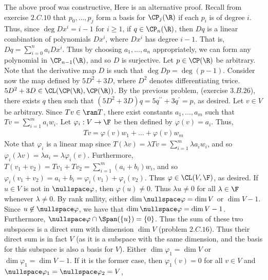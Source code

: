 \documentclass{book}
\begin{document}
\begin{enumerate}[label=\arabic*)]
      The above proof was constructive, Here is an alternative proof. Recall from exercise $2.C.10$ that $p_0, \dots, p_j$ form a basis for $\CP_j(\R)$ if each $p_i$ is of degree $i$. Thus,
      since $\deg D x^{i} = i - 1$ for $i \geq 1$, if $q \in \CP_{n}(\R)$, then $Dq$ is a linear combination of polynomials $Dx^{i}$, where $Dx^{i}$ has degree $i - 1$. That is, $Dq =
      \sum_{i = 0}^{n}a_iDx^{i}$. Thus by choosing $a_1, \dots, a_n$ appropriately, we can form any polynomial in $\CP_{n - 1}(\R)$, and so $D$ is surjective.
    \ii
      Let $p \in \CP(\R)$ be arbitrary. Note that the derivative map $D$ is such that $\deg Dp = \deg (p - 1)$. Consider now the map defined by $5D^2 + 3D$, where $D^2$ denotes
      differentiating twice. $5D^2 + 3D \in \CL(\CP(\R), \CP(\R))$. By the previous problem, (exercise $3.B.26$), there exists $q$ then such that $(5D^2 + 3D)q = 5q^{\prime\prime} +
      3q^{\prime} = p$, as desired.
    \ii
      Let $v \in V$ be arbitrary. Since $Tv \in \ran T$, there exist constants $a_1, \dots, a_m$ such that $Tv = \sum_{i = 1}^{m}a_iw_i$. Let $\varphi_i: V \to \F$ be then defined by
      $\varphi(v) = a_i$. Thus,
      \begin{align*}
        Tv = \varphi(v)w_1 + \dots + \varphi(v)w_m
      \end{align*}
      Note that $\varphi_i$ is a linear map since $T(\lambda v) = \lambda Tv = \sum_{i = 1}^{m}\lambda a_iw_i$, and so $\varphi_i(\lambda v) = \lambda a_i = \lambda\varphi_i(v)$.
      Furthermore, $T(v_1 + v_2) = Tv_1 + Tv_2 = \sum_{i = 1}^{m}(a_i + b_i)w_i$, and so $\varphi_i(v_1 + v_2) = a_i + b_i = \varphi_i(v_1) + \varphi_i(v_2)$. Thus $\varphi \in \CL(V, \F)$,
      as desired.
    \ii
      If $u \in V$ is not in $\nullspace \varphi$, then $\varphi(u) \neq 0$. Thus $\lambda u \neq 0$ for all $\lambda \in \F$ whenever $\lambda \neq 0$. By rank nullity, either
      $\dim\nullspace\varphi = \dim V$ or $\dim V - 1$. Since $u \not\in \nullspace\varphi$, we have that $\dim\nullspace\varphi = \dim V - 1$. Furthermore, $\nullspace\varphi \cap \Span(\{u\}) =
      \{0\}$. Thus the sum of these two subspaces is a direct sum with dimension $\dim V$ (problem $2.C.16$). Thus their direct sum is in fact $V$ (as it is a subspace with the same
      dimension, and the basis for this subspace is also a basis for $V$).
    \ii
      Either $\dim\varphi_1 = \dim V$ or $\dim\varphi_1 = \dim V - 1$. If it is the former case, then $\varphi_1(v) = 0$ for all $v \in V$ and $\nullspace\varphi_1 = \nullspace\varphi_2 = V$,

\end{enumerate}
\end{document}
